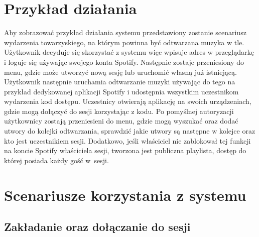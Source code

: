 \section{Przykład działania}
Aby zobrazować przykład działania systemu przedstawiony zostanie scenariusz wydarzenia towarzyskiego, na którym powinna być odtwarzana muzyka w tle. Użytkownik decyduje się skorzystać z systemu więc wpisuje adres w przeglądarkę i loguje się używając swojego konta Spotify. Następnie zostaje przeniesiony do menu, gdzie może utworzyć nową sesję lub uruchomić własną już istniejącą. Użytkownik następnie uruchamia odtwarzanie muzyki używając do tego na przykład dedykowanej aplikacji Spotify i udostępnia wszystkim uczestnikom wydarzenia kod dostępu. Uczestnicy otwierają aplikację na swoich urządzeniach, gdzie mogą dołączyć do sesji korzystając z kodu. Po pomyślnej autoryzacji użytkownicy zostają przeniesieni do menu, gdzie mogą wyszukać oraz dodać utwory do kolejki odtwarzania, sprawdzić jakie utwory są następne w kolejce oraz kto jest uczestnikiem sesji. Dodatkowo, jeśli właściciel nie zablokował tej funkcji na koncie Spotify właściciela sesji, tworzona jest publiczna playlista, dostęp do której posiada każdy gość w~sesji.

\section{Scenariusze korzystania z systemu}
\subsection{Zakładanie oraz dołączanie do sesji}

